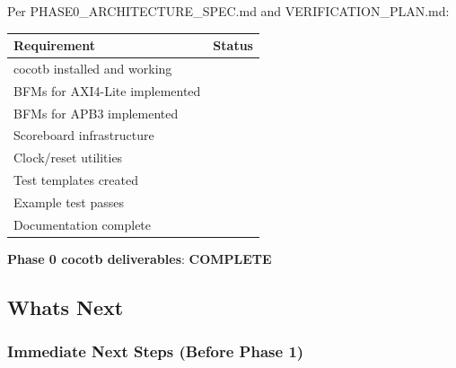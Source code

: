 \begin{record}

Per PHASE0\_\allowbreak{}ARCHITECTURE\_\allowbreak{}SPEC.md and
VERIFICATION\_\allowbreak{}PLAN.md:

{
\begin{longtable}[]{@{}lc@{}}
\toprule\noalign{}
Requirement & Status \\
\midrule\noalign{}
\endhead
\bottomrule\noalign{}
\endlastfoot
cocotb installed and working & \ok{} \\
BFMs for AXI4-Lite implemented & \ok{} \\
BFMs for APB3 implemented & \ok{} \\
Scoreboard infrastructure & \ok{} \\
Clock/\allowbreak{}reset utilities & \ok{} \\
Test templates created & \ok{} \\
Example test passes & \ok{} \\
Documentation complete & \ok{} \\
\end{longtable}
}

\textbf{Phase 0 cocotb deliverables}: \ok{} \textbf{COMPLETE}

\end{record}

\subsection{What\textquotesingle s Next}\label{cr:app:archive-cocotb-setup-summary:whats-next}

\subsubsection{Immediate Next Steps (Before Phase 1)}\label{cr:app:archive-cocotb-setup-summary:immediate-next-steps-before-phase-1}

